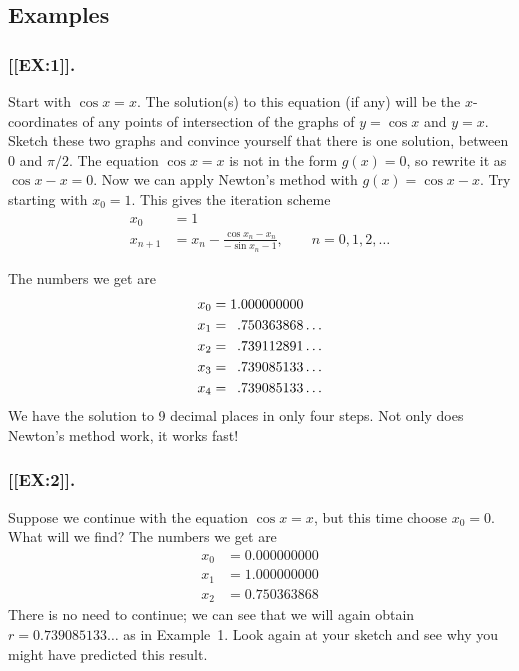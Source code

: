 \subsection{Examples}
\label{subsec:examples}


\subsubsection{[[EX:1]].}
Start with $\cos{x} = x$.  The solution(s) to this
equation (if any) will be the $x$-coordinates of any points of
intersection of the graphs of $y = \cos{x}$ and $y = x$.  Sketch
these two graphs and convince yourself that there is one solution,
between 0 and $\pi/2$.  The equation $\cos{x} = x$ is not in the
form $g(x) = 0$, so rewrite it as $\cos{x} - x = 0$.  Now we can
apply Newton's method with $g(x) = \cos{x} - x$.  Try starting with
$x_{0} = 1$.  This gives the iteration scheme
\begin{align*}             
       x_{0} &= 1      \\
     x_{n+1} &= x_{n} - \frac{\cos{x_{n}} - x_{n}}{-\sin{x_{n}} - 1}, 
         \qquad n = 0,1,2, \ldots  
\end{align*}

 The numbers we get are
\begin{align*}
        x_{0} &= 1.000000000  \\
        x_{1} &= \hphantom{1}.750363868 \ldots \\
        x_{2} &= \hphantom{1}.739112891 \ldots \\
        x_{3} &= \hphantom{1}.739085133 \ldots \\
        x_{4} &= \hphantom{1}.739085133 \ldots 
\end{align*}
We have the solution to 9 decimal places in only four steps.  Not only
does Newton's method work, it works fast!



\subsubsection{[[EX:2]].}
Suppose we continue with the equation $\cos{x} = x$,
but this time choose $x_{0} = 0$.  What will we find?  The numbers we
get are
\begin{align*}
        x_{0} &= 0.000000000  \\
        x_{1} &= 1.000000000  \\
        x_{2} &= 0.750363868
\end{align*}   
There is no need to continue; we can see that we will again obtain $r
= 0.739085133 \ldots$ as in Example~1.  Look again at your sketch and
see why you might have predicted this result.






